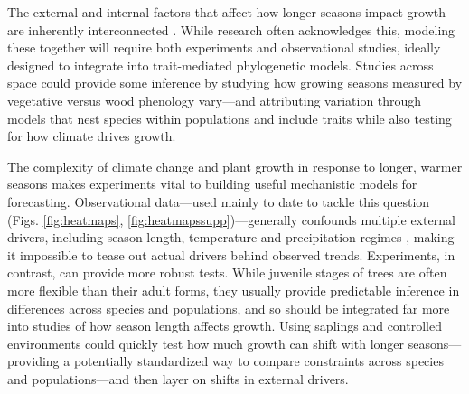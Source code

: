 \documentclass[11pt]{article}
\newcommand{\R}[1]{\label{#1}\linelabel{#1}}
\begin{document}

\R{R3complaint1S}The external and internal factors that affect how longer seasons impact growth are inherently interconnected \citep{nobel1983biophysical}. While research often acknowledges this, modeling these together will require both experiments and observational studies, ideally designed to integrate into trait-mediated phylogenetic models. Studies across space could provide some inference by studying how growing seasons measured by vegetative versus wood phenology vary---and attributing variation through models that nest species within populations and include traits while also testing for how climate drives growth.  


The complexity of climate change and plant growth in response to longer, warmer seasons makes experiments vital to building useful mechanistic models for forecasting. Observational data---used mainly to date to tackle this question (Figs. \ref{fig:heatmaps}, \ref{fig:heatmapssupp})---generally confounds multiple external drivers, including season length, temperature and precipitation regimes \citep{ren2019,ipcc2021,camarero2022decoupled}, making it impossible to tease out actual drivers behind observed trends. \R{R3complaint5S1}Experiments, in contrast, can provide more robust tests. While juvenile stages of trees are often more flexible than their adult forms, they usually provide predictable inference in differences across species and populations, and so should be integrated far more into studies of how season length affects growth. Using saplings and controlled environments could quickly test how much growth can shift with longer seasons---providing a potentially standardized way to compare constraints across species and populations---and then layer on shifts in external drivers. %
\end{document}
